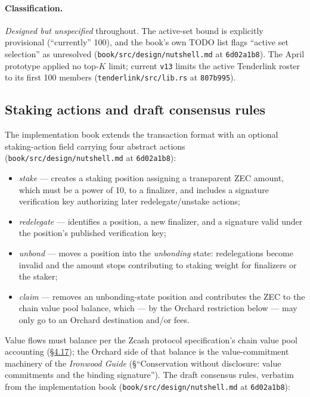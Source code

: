 \documentclass[11pt,a4paper]{article}
\theoremstyle{definition}
\begin{document}
\paragraph{Classification.} \emph{Designed but unspecified} throughout.
The active-set bound is explicitly provisional (``currently'' 100), and
the book's own TODO list flags ``active set selection'' as unresolved
(\texttt{book/src/design/nutshell.md} at \texttt{6d02a1b8}). The April
prototype applied no top-$K$ limit; current \texttt{v13} limits the active
Tenderlink roster to its first 100 members
(\texttt{tenderlink/src/lib.rs} at \texttt{807b995}).

\subsection{Staking actions and draft consensus rules}
\label{sec:xl-stake-actions}

The implementation book extends the transaction format with an optional
staking-action field carrying four abstract actions
(\texttt{book/src/design/nutshell.md} at \texttt{6d02a1b8}):

\begin{itemize}
\item \emph{stake} --- creates a staking position assigning a transparent
  ZEC amount, which must be a power of 10, to a finalizer, and includes a
  signature verification key authorizing later redelegate/unstake actions;
\item \emph{redelegate} --- identifies a position, a new finalizer, and a
  signature valid under the position's published verification key;
\item \emph{unbond} --- moves a position into the \emph{unbonding} state:
  redelegations become invalid and the amount stops contributing to
  staking weight for finalizers or the staker;
\item \emph{claim} --- removes an unbonding-state position and contributes
  the ZEC to the chain value pool balance, which --- by the Orchard
  restriction below --- may only go to an Orchard destination and/or fees.
\end{itemize}

Value flows must balance per the Zcash protocol specification's chain
value pool accounting (\href{https://zips.z.cash/protocol/protocol.pdf\#chainvaluepoolbalances}{\S4.17}); the Orchard side of that balance is the
value-commitment machinery of the \emph{Ironwood Guide} (\S``Conservation
without disclosure: value commitments and the binding signature''). The draft
consensus rules, verbatim from the implementation book
(\texttt{book/src/design/nutshell.md} at \texttt{6d02a1b8}):
\end{document}
